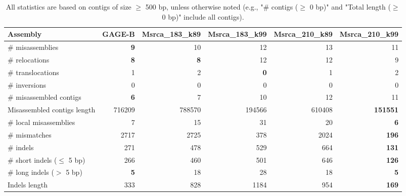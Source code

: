 \documentclass[12pt,a4paper]{article}
\begin{document}
\begin{table}[ht]
\begin{center}
\caption{All statistics are based on contigs of size $\geq$ 500 bp, unless otherwise noted (e.g., "\# contigs ($\geq$ 0 bp)" and "Total length ($\geq$ 0 bp)" include all contigs).}
\begin{tabular}{|l*{5}{|r}|}
\hline
Assembly & GAGE-B & Msrca\_183\_k89 & Msrca\_183\_k99 & Msrca\_210\_k89 & Msrca\_210\_k99 \\ \hline
\# misassemblies & {\bf 9} & 10 & 12 & 13 & 11 \\ \hline
\hspace{5mm}\# relocations & {\bf 8} & {\bf 8} & 12 & 12 & 9 \\ \hline
\hspace{5mm}\# translocations & 1 & 2 & {\bf 0} & 1 & 2 \\ \hline
\hspace{5mm}\# inversions & 0 & 0 & 0 & 0 & 0 \\ \hline
\# misassembled contigs & {\bf 6} & 7 & 10 & 12 & 11 \\ \hline
Misassembled contigs length & 716209 & 788570 & 194566 & 610408 & {\bf 151551} \\ \hline
\# local misassemblies & 7 & 15 & 31 & 20 & {\bf 6} \\ \hline
\# mismatches & 2717 & 2725 & 378 & 2024 & {\bf 196} \\ \hline
\# indels & 271 & 478 & 529 & 664 & {\bf 131} \\ \hline
\hspace{5mm}\# short indels ($\leq$ 5 bp) & 266 & 460 & 501 & 646 & {\bf 126} \\ \hline
\hspace{5mm}\# long indels ($>$ 5 bp) & {\bf 5} & 18 & 28 & 18 & {\bf 5} \\ \hline
Indels length & 333 & 828 & 1184 & 954 & {\bf 169} \\ \hline
\end{tabular}
\end{center}
\end{table}
\end{document}
